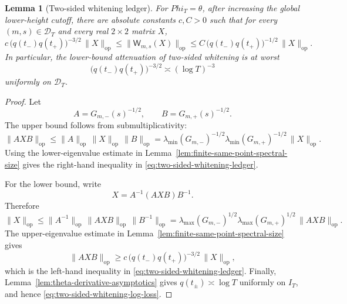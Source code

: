 \documentclass[11pt,a4paper]{amsart}
\def\Phi{Phi}%
\numberwithin{equation}{section}
\theoremstyle{plain}
\newtheorem{lemma}[theorem]{Lemma}
\theoremstyle{definition}
\newcommand{\Ph}{\Phi}
\newcommand{\op}{\mathrm{op}}
\begin{document}
\begin{lemma}[Two-sided whitening ledger]
\label{lem:two-sided-whitening-ledger}
For \(\Ph_T=\theta\), after increasing the global lower-height cutoff,
there are absolute constants \(c,C>0\) such that for every
\((m,s)\in\mathcal D_T\) and every real \(2\times2\) matrix \(X\),
\begin{equation}
\label{eq:two-sided-whitening-ledger}
        c\,\bigl(q(t_-)q(t_+)\bigr)^{-3/2}\,
        \|X\|_{\op}
        \le
        \|\mathsf W_{m,s}(X)\|_{\op}
        \le
        C\,\bigl(q(t_-)q(t_+)\bigr)^{-1/2}\,
        \|X\|_{\op}.
\end{equation}
In particular, the lower-bound attenuation of two-sided whitening is at
worst
\begin{equation}
\label{eq:two-sided-whitening-log-loss}
        \bigl(q(t_-)q(t_+)\bigr)^{-3/2}
        \asymp (\log T)^{-3}
\end{equation}
uniformly on \(\mathcal D_T\).
\end{lemma}

\begin{proof}
Let
\[
        A=G_{m,-}(s)^{-1/2},\qquad B=G_{m,+}(s)^{-1/2}.
\]
The upper bound follows from submultiplicativity:
\[
        \|AXB\|_{\op}
        \le \|A\|_{\op}\,\|X\|_{\op}\,\|B\|_{\op}
        = \lambda_{\min}(G_{m,-})^{-1/2}
          \lambda_{\min}(G_{m,+})^{-1/2}\,\|X\|_{\op}.
\]
Using the lower-eigenvalue estimate in
Lemma~\ref{lem:finite-same-point-spectral-size} gives the right-hand
inequality in \eqref{eq:two-sided-whitening-ledger}.

For the lower bound, write
\[
        X=A^{-1}(AXB)B^{-1}.
\]
Therefore
\[
        \|X\|_{\op}
        \le \|A^{-1}\|_{\op}\,\|AXB\|_{\op}\,\|B^{-1}\|_{\op}
        =\lambda_{\max}(G_{m,-})^{1/2}
         \lambda_{\max}(G_{m,+})^{1/2}\,\|AXB\|_{\op}.
\]
The upper-eigenvalue estimate in
Lemma~\ref{lem:finite-same-point-spectral-size} gives
\[
        \|AXB\|_{\op}
        \ge
        c\,\bigl(q(t_-)q(t_+)\bigr)^{-3/2}\,
        \|X\|_{\op},
\]
which is the left-hand inequality in
\eqref{eq:two-sided-whitening-ledger}.  Finally,
Lemma~\ref{lem:theta-derivative-asymptotics} gives
\(q(t_\pm)\asymp\log T\) uniformly on \(I_T\), and hence
\eqref{eq:two-sided-whitening-log-loss}.
\end{proof}
\end{document}
